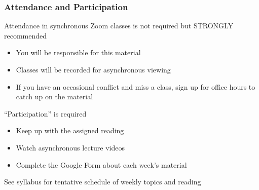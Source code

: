 \documentclass{beamer}
\begin{document}
\begin{frame}\frametitle{Attendance and Participation}
    Attendance in synchronous Zoom classes is not required but STRONGLY recommended
    \begin{itemize}
        \item You will be responsible for this material
        \item Classes will be recorded for asynchronous viewing
        \item If you have an occasional conflict and miss a class, sign up for office hours to catch up on the material
    \end{itemize}
    \vspace{2ex}
    ``Participation'' is required
    \begin{itemize}
        \item Keep up with the assigned reading
        \item Watch asynchronous lecture videos
        \item Complete the Google Form about each week's material
    \end{itemize}
    \vspace{2ex}
    See syllabus for tentative schedule of weekly topics and reading
\end{frame}
\end{document}

